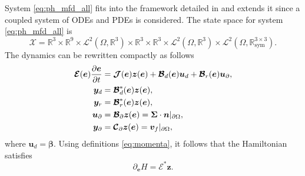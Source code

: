 \documentclass{svjour3}                     %
\begin{document}
System \eqref{eq:ph_mfd_all} fits into the framework detailed in \cite{mehrmann2019structurepreserving} and extends it since a coupled system of ODEs and PDEs is considered. The state space for system \eqref{eq:ph_mfd_all} is 
\[
\mathscr{X} = \mathbb{R}^3 \times \mathbb{R}^9 \times \mathscr{L}^2(\Omega, \mathbb{R}^{3}) \times \mathbb{R}^3 \times \mathbb{R}^3 \times \mathscr{L}^2(\Omega, \mathbb{R}^{3}) \times \mathscr{L}^2(\Omega, \mathbb{R}^{3\times 3}_{\text{sym}}).
\] 
The dynamics can be rewritten compactly as follows
\begin{equation}
\label{eq:MFD_pHDAE}
\begin{aligned}
\bm{\mathcal{E}}(\bm{e}) \diffp{\bm{e}}{t} &= \bm{\mathcal{J}}(\bm{e}) \bm{z}(\bm{e}) + \bm{\mathcal{B}}_d(\bm{e}) \bm{u}_d + \bm{\mathcal{B}}_r(\bm{e}) \bm{u}_\partial, \\
\bm{y}_d &= \bm{\mathcal{B}}_d^*(\bm{e}) \bm{z}(\bm{e}), \\
\bm{y}_r &= \bm{\mathcal{B}}_r^*(\bm{e}) \bm{z}(\bm{e}), \\
\bm{u}_\partial &= \bm{\mathcal{B}}_{\partial} \bm{z}(\bm{e}) =  \bm\Sigma \cdot \bm{n}|_{\partial \Omega}, \\
\bm{y}_\partial &= \bm{\mathcal{C}}_{\partial} \bm{z}(\bm{e}) = \bm{v}_f|_{\partial \Omega},
\end{aligned}
\end{equation}
where $\bm{u}_d = \bm\beta$. Using definitions  \eqref{eq:momenta}, it follows that the Hamiltonian  satisfies 
\begin{equation}
\label{eq:gradH}
\partial_{\bm{e}} H = \bm{\mathcal{E}}^* \bm{z}.
\end{equation}
\end{document}
